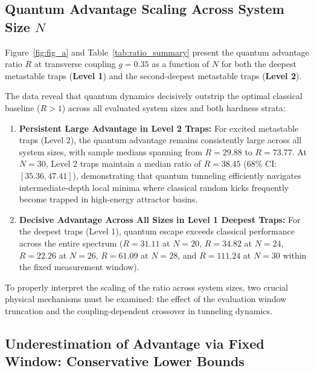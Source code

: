 \subsection{Quantum Advantage Scaling Across System Size $N$}
\label{subsec:scaling_R}

Figure~\ref{fig:fig_a} and Table~\ref{tab:ratio_summary} present the quantum advantage ratio $R$ at transverse coupling $g = 0.35$ as a function of $N$ for both the deepest metastable traps (\textbf{Level 1}) and the second-deepest metastable traps (\textbf{Level 2}). 

The data reveal that quantum dynamics decisively outstrip the optimal classical baseline ($R > 1$) across all evaluated system sizes and both hardness strata:
\begin{enumerate}
    \item \textbf{Persistent Large Advantage in Level 2 Traps:} For excited metastable traps (Level 2), the quantum advantage remains consistently large across all system sizes, with sample medians spanning from $R = 29.88$ to $R = 73.77$. At $N = 30$, Level 2 traps maintain a median ratio of $R = 38.45$ ($68\%$ CI: $[35.36, 47.41]$), demonstrating that quantum tunneling efficiently navigates intermediate-depth local minima where classical random kicks frequently become trapped in high-energy attractor basins.
    \item \textbf{Decisive Advantage Across All Sizes in Level 1 Deepest Traps:} For the deepest traps (Level 1), quantum escape exceeds classical performance across the entire spectrum ($R = 31.11$ at $N=20$, $R = 34.82$ at $N=24$, $R = 22.26$ at $N=26$, $R = 61.09$ at $N=28$, and $R = 111.24$ at $N=30$ within the fixed measurement window).
\end{enumerate}

To properly interpret the scaling of the ratio across system sizes, two crucial physical mechanisms must be examined: the effect of the evaluation window truncation and the coupling-dependent crossover in tunneling dynamics.

\subsection{Underestimation of Advantage via Fixed Window: Conservative Lower Bounds}
\label{subsec:conservative_window}

